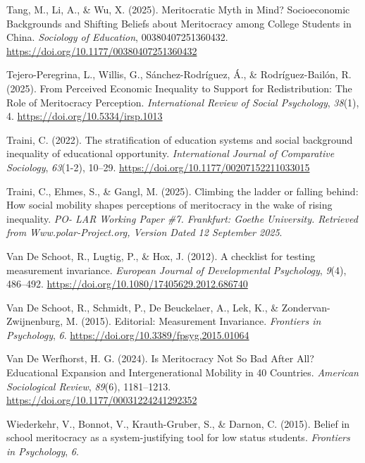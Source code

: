 \documentclass[
  13pt,
]{article}
\newlength{\cslhangindent}
\newenvironment{CSLReferences}[2] %
 {\begin{list}{}{%
  \setlength{\itemindent}{0pt}
  \setlength{\leftmargin}{0pt}
  \setlength{\parsep}{0pt}
  \ifodd #1
   \setlength{\leftmargin}{\cslhangindent}
   \setlength{\itemindent}{-1\cslhangindent}
  \fi
  \setlength{\itemsep}{#2\baselineskip}}}
 {\end{list}}
\begin{document}
\begin{CSLReferences}{1}{0}
Tang, M., Li, A., \& Wu, X. (2025). Meritocratic {Myth} in {Mind}?
{Socioeconomic Backgrounds} and {Shifting Beliefs} about {Meritocracy}
among {College Students} in {China}. \emph{Sociology of Education},
00380407251360432. \url{https://doi.org/10.1177/00380407251360432}

Tejero-Peregrina, L., Willis, G., Sánchez-Rodríguez, Á., \&
Rodríguez-Bailón, R. (2025). From {Perceived Economic Inequality} to
{Support} for {Redistribution}: {The Role} of {Meritocracy Perception}.
\emph{International Review of Social Psychology}, \emph{38}(1), 4.
\url{https://doi.org/10.5334/irsp.1013}

Traini, C. (2022). The stratification of education systems and social
background inequality of educational opportunity. \emph{International
Journal of Comparative Sociology}, \emph{63}(1-2), 10--29.
\url{https://doi.org/10.1177/00207152211033015}

Traini, C., Ehmes, S., \& Gangl, M. (2025). Climbing the ladder or
falling behind: {How} social mobility shapes perceptions of meritocracy
in the wake of rising inequality. \emph{PO- LAR Working Paper \#7.
Frankfurt: Goethe University. Retrieved from Www.polar-Project.org,
Version Dated 12 September 2025}.

Van De Schoot, R., Lugtig, P., \& Hox, J. (2012). A checklist for
testing measurement invariance. \emph{European Journal of Developmental
Psychology}, \emph{9}(4), 486--492.
\url{https://doi.org/10.1080/17405629.2012.686740}

Van De Schoot, R., Schmidt, P., De Beuckelaer, A., Lek, K., \&
Zondervan-Zwijnenburg, M. (2015). Editorial: {Measurement Invariance}.
\emph{Frontiers in Psychology}, \emph{6}.
\url{https://doi.org/10.3389/fpsyg.2015.01064}

Van De Werfhorst, H. G. (2024). Is {Meritocracy Not So Bad After All}?
{Educational Expansion} and {Intergenerational Mobility} in 40
{Countries}. \emph{American Sociological Review}, \emph{89}(6),
1181--1213. \url{https://doi.org/10.1177/00031224241292352}

Wiederkehr, V., Bonnot, V., Krauth-Gruber, S., \& Darnon, C. (2015).
Belief in school meritocracy as a system-justifying tool for low status
students. \emph{Frontiers in Psychology}, \emph{6}.


\end{CSLReferences}
\end{document}

